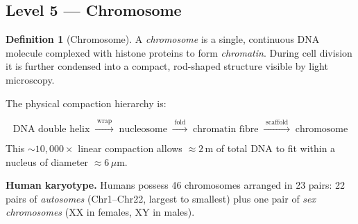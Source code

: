 \documentclass[12pt, a4paper, oneside]{book}
\theoremstyle{definition}
\newtheorem{definition}{Definition}[chapter]
\theoremstyle{remark}
\begin{document}
\subsection{Level 5 — Chromosome}
\label{subsec:chromosome}

\begin{definition}[Chromosome]
A \emph{chromosome} is a single, continuous DNA molecule complexed with
histone proteins to form \emph{chromatin}.  During cell division it is
further condensed into a compact, rod-shaped structure visible by light
microscopy.
\end{definition}

The physical compaction hierarchy is:

\begin{equation}
  \text{DNA double helix}
  \;\xrightarrow{\;\text{wrap}\;}\;
  \text{nucleosome}
  \;\xrightarrow{\;\text{fold}\;}\;
  \text{chromatin fibre}
  \;\xrightarrow{\;\text{scaffold}\;}\;
  \text{chromosome}
\end{equation}

This $\sim\!10{,}000\times$ linear compaction allows $\approx 2\,\text{m}$
of total DNA to fit within a nucleus of diameter $\approx 6\,\mu\text{m}$.

\textbf{Human karyotype.}
Humans possess 46 chromosomes arranged in 23 pairs: 22 pairs of
\emph{autosomes} (Chr1--Chr22, largest to smallest) plus one pair of
\emph{sex chromosomes} (XX in females, XY in males).

\begin{center}
\end{center}
\end{document}
